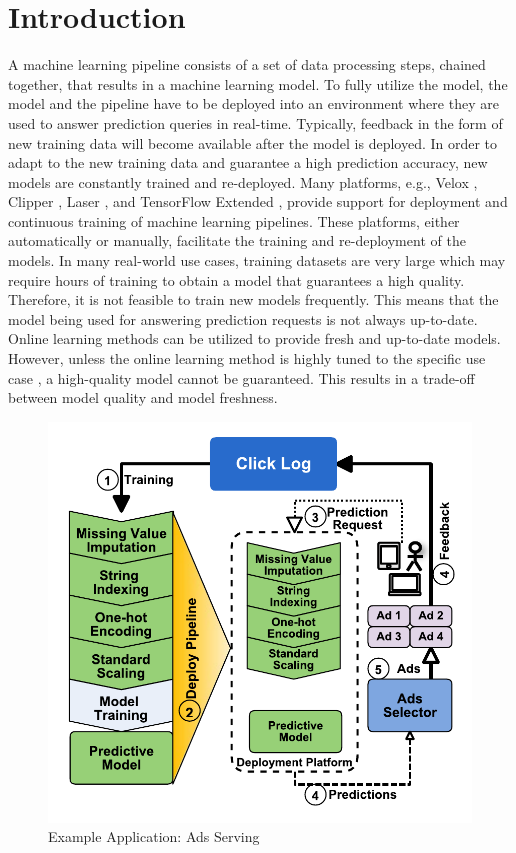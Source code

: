 \section{Introduction} \label{introduction}
A machine learning pipeline consists of a set of data processing steps, chained together, that results in a machine learning model.
To fully utilize the model,  the model and the pipeline have to be deployed into an environment where they are used to answer prediction queries in real-time.
Typically, feedback in the form of new training data will become available after the model is deployed.
In order to adapt to the new training data and guarantee a high prediction accuracy, new models are constantly trained and re-deployed.
Many platforms, e.g., Velox \cite{crankshaw2014missing}, Clipper \cite{crankshaw2016clipper}, Laser \cite{agarwal2014laser}, and TensorFlow Extended \cite{baylor2017tfx}, provide support for deployment and continuous training of machine learning pipelines. 
These platforms, either automatically or manually, facilitate the training and re-deployment of the models.
In many real-world use cases, training datasets are very large which may require hours of training to obtain a model that guarantees a high quality.
Therefore, it is not feasible to train new models frequently.
This means that the model being used for answering prediction requests is not always up-to-date.
Online learning methods can be utilized to provide fresh and up-to-date models.
However, unless the online learning method is highly tuned to the specific use case \cite{ma2009identifying}, a high-quality model cannot be guaranteed.
This results in a trade-off between model quality and model freshness.
\begin{figure}[h!]
\centering
\includegraphics[width=\columnwidth]{../images/motivational-example-vertical-small-cropped.pdf}
\caption{Example Application: Ads Serving}
\label{fig:motivational-example}
\end{figure}


